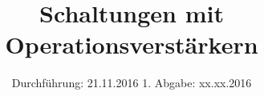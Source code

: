 


\subject{Versuch 51}
\title{Schaltungen mit Operationsverstärkern}
\date{
  Durchführung: 21.11.2016
  \hspace{3em}
  1. Abgabe: xx.xx.2016
}




\maketitle
\thispagestyle{empty}
\tableofcontents
\newpage

%
%
%
%
%
%
%
%
%
%


\printbibliography


